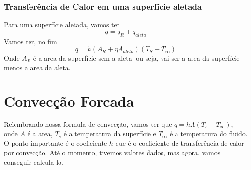 \subsubsection{Transferência de Calor em uma superfície aletada}
Para uma superfície aletada, vamos ter
\begin{equation}
    q = q_R + q_{aleta}
\end{equation}
Vamos ter, no fim
\begin{equation}
    q = h \left(A_R + \eta A_{aleta}\right)\left(T_S - T_\infty\right)
\end{equation}
Onde \(A_R\) é a area da superfície sem a aleta, ou seja, vai ser a area da superfície menos a area
da aleta.
\section{Convecção Forcada}
Relembrando nossa formula de convecção, vamos ter que \(q = hA(T_s - T_\infty)\), onde \(A\) é a
area, \(T_s\) é a temperatura da superfície e \(T_\infty\) é a temperatura do fluido. O ponto
importante é o coeficiente \(h\) que é o coeficiente de transferência de calor por convecção. Até o
momento, tivemos valores dados, mas agora, vamos conseguir calcula-lo.\par

